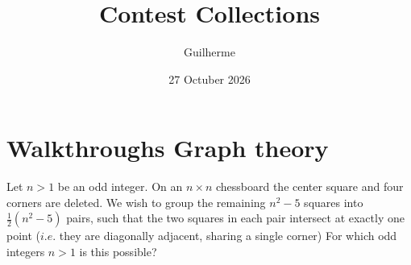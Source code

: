 \documentclass[11pt]{scrartcl}
\title{Contest Collections}
\author{Guilherme}
\date{27 Octuber 2026}
\begin{document}
\maketitle

\section{Walkthroughs Graph theory}

\begin{problem}
  Let $n >1$ be an odd integer. On an $n\times n$ chessboard the center square and four corners are deleted. We wish to
  group the remaining $n^2-5$ squares into $\frac{1}{2} (n^2 -5)$ pairs, such that the two squares in each pair intersect
  at exactly one point ($i.e.$ they are diagonally adjacent, sharing a single corner)
For which odd integers $n > 1$ is this possible?
\end{problem}
\end{document}

